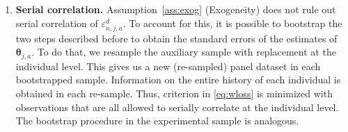 \begin{enumerate}
\item \textbf{Serial correlation.} Assumption~\ref{ass:exog} (Exogeneity) does not rule out serial correlation of $\varepsilon^d_{n,j,a}$. To account for this, it is possible to bootstrap the two steps described before to obtain the standard errors of the estimates of $ \bm{\theta}_{j,a}$. To do that, we resample the auxiliary sample with replacement at the individual level. This gives us a new (re-sampled) panel dataset in each bootstrapped sample. Information on the entire history of each individual is obtained in each re-sample. Thus, criterion in \eqref{eq:wloss} is minimized with observations that are all allowed to serially correlate at the individual level.\\

\noindent The bootstrap procedure in the experimental sample is analogous.

\end{enumerate}









\pagebreak
\singlespace






